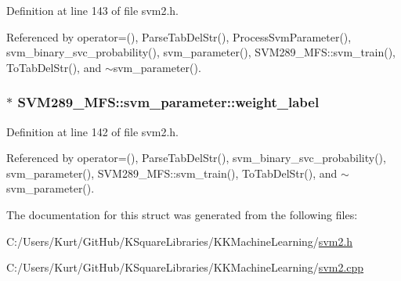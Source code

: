 Definition at line 143 of file svm2.\+h.



Referenced by operator=(), Parse\+Tab\+Del\+Str(), Process\+Svm\+Parameter(), svm\+\_\+binary\+\_\+svc\+\_\+probability(), svm\+\_\+parameter(), S\+V\+M289\+\_\+\+M\+F\+S\+::svm\+\_\+train(), To\+Tab\+Del\+Str(), and $\sim$svm\+\_\+parameter().

\subsubsection[{\texorpdfstring{weight\+\_\+label}{weight_label}}]{$\ast$ S\+V\+M289\+\_\+\+M\+F\+S\+::svm\+\_\+parameter\+::weight\+\_\+label}\hypertarget{struct_s_v_m289___m_f_s_1_1svm__parameter_a729c98939a2e1a5859fcad70bbabf063}{}\label{struct_s_v_m289___m_f_s_1_1svm__parameter_a729c98939a2e1a5859fcad70bbabf063}


Definition at line 142 of file svm2.\+h.



Referenced by operator=(), Parse\+Tab\+Del\+Str(), svm\+\_\+binary\+\_\+svc\+\_\+probability(), svm\+\_\+parameter(), S\+V\+M289\+\_\+\+M\+F\+S\+::svm\+\_\+train(), To\+Tab\+Del\+Str(), and $\sim$svm\+\_\+parameter().



The documentation for this struct was generated from the following files\+:\begin{DoxyCompactItemize}
\item 
C\+:/\+Users/\+Kurt/\+Git\+Hub/\+K\+Square\+Libraries/\+K\+K\+Machine\+Learning/\hyperlink{svm2_8h}{svm2.\+h}\item 
C\+:/\+Users/\+Kurt/\+Git\+Hub/\+K\+Square\+Libraries/\+K\+K\+Machine\+Learning/\hyperlink{svm2_8cpp}{svm2.\+cpp}\end{DoxyCompactItemize}
